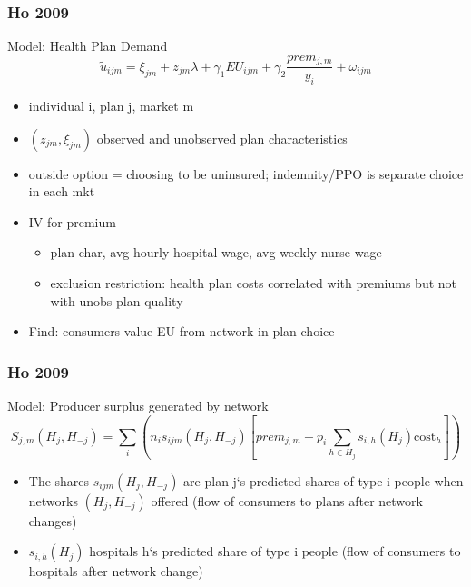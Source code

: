 \documentclass[notes=show]{beamer}
\begin{document}
\begin{frame}
\frametitle{Ho 2009}

Model: Health Plan Demand
\[
\widetilde{u}_{ijm}=\xi _{jm}+z_{jm}\lambda +\gamma _{1}EU_{ijm}+\gamma _{2}%
\frac{prem_{j,m}}{y_{i}}+\omega _{ijm}
\]

\begin{itemize}
\item individual i, plan j, market m
\item $(z_{jm},\xi_{jm})$ observed and unobserved plan characteristics
\item outside option = choosing to be uninsured; indemnity/PPO is separate choice in each mkt
\item IV for premium
\begin{itemize}
\item plan char, avg hourly hospital wage, avg weekly nurse wage
\item exclusion restriction: health plan costs correlated with premiums but not with unobs plan quality
\end{itemize}
\item Find: consumers value EU from network in plan choice
\end{itemize}

\end{frame}

\begin{frame}
\frametitle{Ho 2009}

Model: Producer surplus generated by network
\[
S_{j,m}(H_{j},H_{-j})=\sum%
\limits_{i}(n_{i}s_{ijm}(H_{j},H_{-j})[prem_{j,m}-p_{i}\sum \limits_{h\in
H_{j}}s_{i,h}(H_{j})\text{cost}_{h}])
\]

\begin{itemize}
\item The shares $s_{ijm}(H_{j},H_{-j})$ are plan j`s predicted shares of type i people when networks $(H_{j},H_{-j})$ offered (flow of consumers to plans after network changes)
\item $s_{i,h}(H_{j})$ hospitals h`s predicted share of type i people (flow of consumers to hospitals after network change)

\end{itemize}

\end{frame}
\end{document}
